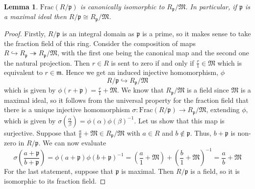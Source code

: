 \documentclass{article}
\newtheorem{lemma}{Lemma}[section]
\newcommand{\mfrak}[1]{\mathfrak{#1}}
\begin{document}
\begin{lemma} \label{lem: Canonical localization isomorphism}
    $\text{Frac}(R / \mfrak p)$ is canonically isomorphic to $R_\mfrak p / \mfrak M$. In particular, if $\mfrak p$ is a maximal ideal then $R / \mfrak p \cong R_\mfrak p / \mfrak M$.
\end{lemma}
\begin{proof}
    Firstly, $R / \mfrak p$ is an integral domain as $\mfrak p$ is a prime, so it makes sense to take the fraction field of this ring. Consider the composition of maps $R \hookrightarrow R_\mfrak p \twoheadrightarrow R_\mfrak p / \mfrak M$, with the first one being the canonical map and the second one the natural projection. Then $r \in R$ is sent to zero if and only if $\frac{r}{1} \in \mfrak M$ which is equivalent to $r \in \mfrak m$. Hence we get an induced injective homomorphism, $\phi$
    $$R / \mfrak p \hookrightarrow R_\mfrak p / \mfrak M$$
    which is given by $\phi(r + \mfrak p) = \frac{r}{1} + \mfrak M$. We know that $R_\mfrak p / \mfrak M$ is a field since $\mfrak M$ is a maximal ideal, so it follows from the universal property for the fraction field that there is a unique injective homomorphism $\sigma : \text{Frac}(R / \mfrak p) \to R_\mfrak p / \mfrak M$, extending $\phi$, which is given by $\sigma(\frac{\alpha}{\beta}) = \phi(\alpha)\phi(\beta)^{-1}$. Let us show that this map is surjective. Suppose that $\frac{a}{b} + \mfrak M  \in R_\mfrak p / \mfrak M$ with $a \in R$ and $b \notin \mfrak p$. Thus, $b + \mfrak p$ is non-zero in $R / \mfrak p$. We can now evaluate 
    $$\sigma(\frac{a + \mfrak p}{b + \mfrak p}) = \phi(a + \mfrak p)\phi(b + \mfrak p)^{-1} = (\frac{a}{1} + \mfrak M) + (\frac{b}{1} + \mfrak M)^{-1} = \frac{a}{b} + \mfrak M$$ 
    For the last statement, suppose that $\mfrak p$ is maximal. Then $R / \mfrak p$ is a field, so it is isomorphic to its fraction field. 
\end{proof}
\end{document}
